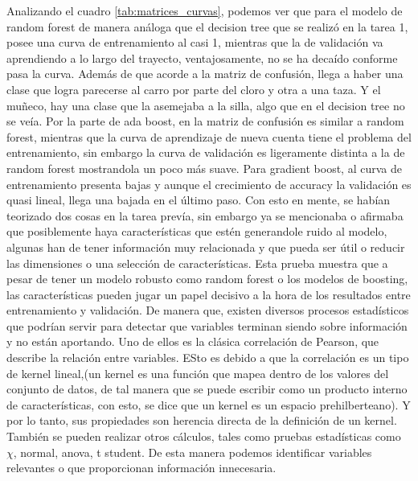 \documentclass[conference]{IEEEtran}
\begin{document}
Analizando el cuadro \ref{tab:matrices_curvas}, podemos ver que para el modelo de random forest de manera análoga que el decision tree que se realizó en la tarea 1, posee una curva de entrenamiento al casi 1, mientras que la de validación va aprendiendo a lo largo del trayecto, ventajosamente, no se ha decaído conforme pasa la curva. Además de que acorde a la matriz de confusión, llega a haber una clase que logra parecerse al carro por parte del cloro y otra a una taza. Y el muñeco, hay una clase que la asemejaba a la silla, algo que en el decision tree no se veía. Por la parte de ada boost, en la matriz de confusión es similar a random forest, mientras que la curva de aprendizaje de nueva cuenta tiene el problema del entrenamiento, sin embargo la curva de validación es ligeramente distinta a la de random forest mostrandola un poco más suave. 
Para gradient boost, al curva de entrenamiento presenta bajas y aunque el crecimiento de accuracy la validación es quasi lineal, llega una bajada en el último paso.
Con esto en mente, se habían teorizado dos cosas en la tarea prevía, sin embargo ya se mencionaba o afirmaba que posiblemente haya características que estén generandole ruido al modelo, algunas han de tener información muy relacionada y que pueda ser útil o reducir las dimensiones o una selección de características. Esta prueba muestra que a pesar de tener un modelo robusto como random forest o los modelos de boosting, las características pueden jugar un papel decisivo a la hora de los resultados entre entrenamiento y validación. 
De manera que, existen diversos procesos estadísticos que podrían servir para detectar que variables terminan siendo sobre información y no están aportando. Uno de ellos es la clásica correlación de Pearson, que describe la relación entre variables. ESto es debido a que la correlación es un tipo de kernel lineal,(un kernel es una función que mapea dentro de los valores del conjunto de datos, de tal manera que se puede escribir como un producto interno de características, con esto, se dice que un kernel es un espacio prehilberteano). Y por lo tanto, sus propiedades son herencia directa de la definición de un kernel. También se pueden realizar otros cálculos, tales como pruebas estadísticas como $\chi$, normal, anova, t student. De esta manera podemos identificar variables relevantes o que proporcionan información innecesaria.
\end{document}
